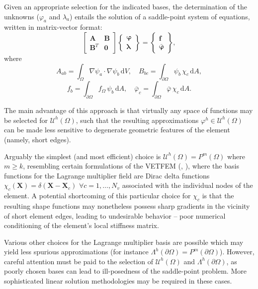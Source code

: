 Given an appropriate selection for the indicated bases, the determination of the unknowns ($\varphi_a$ and $\lambda_a$) entails the solution of a saddle-point system of equations, written in matrix-vector format:
\begin{equation}
	\left[ \begin{array}{cc} \bm{A} & \bm{B} \\ \bm{B}^T & \bm{0} \end{array} \right] \left\{ \begin{array}{c} \boldsymbol{\varphi} \\ \boldsymbol{\lambda} \end{array} \right\} = \left\{ \begin{array}{c} \bm{f} \\ \bar{\boldsymbol{\varphi}} \end{array} \right\},
\end{equation}
where
\begin{equation}
	A_{ab} = \int_{\Omega} \nabla \psi_a \cdot \nabla \psi_b \, \mathrm dV, \quad B_{bc} = \int_{\partial \Omega} \psi_b \, \chi_c \, \mathrm dA,
\end{equation}
\begin{equation}
	f_{b} = \int_{\partial \Omega} f_\Omega \, \psi_b \, \mathrm dA, \quad \bar{\varphi}_{c} = \int_{\partial \Omega} \bar{\varphi} \, \chi_c \, \mathrm dA.
\end{equation}

	The main advantage of this approach is that virtually any space of functions may be selected for $\mathcal{U}^h (\Omega)$, such that the resulting approximations $\varphi^h \in \mathcal{U}^h (\Omega)$ can be made less sensitive to degenerate geometric features of the element (namely, short edges).
	
	Arguably the simplest (and most efficient) choice is $\mathcal{U}^h (\Omega) = P^{m} (\Omega)$ where $m \geq k$, resembling certain formulations of the VETFEM (\cite{Rashid:00}, \cite{Rashid:06}), where the basis functions for the Lagrange multiplier field are Dirac delta functions $\chi_c (\bm{X}) = \delta (\bm{X} - \bm{X}_c) \, \, \forall c = 1, \ldots, N_v$ associated with the individual nodes of the element. A potential shortcoming of this particular choice for $\chi_c$ is that the resulting shape functions may nonetheless possess sharp gradients in the vicinity of short element edges, leading to undesirable behavior -- poor numerical conditioning of the element's local stiffness matrix.
	
	Various other choices for the Lagrange multiplier basis are possible which may yield less spurious approximations (for instance $\Lambda^h (\partial \Omega) = P^{m} (\partial \Omega)$). However, careful attention must be paid to the selection of $\mathcal{U}^h (\Omega)$ and $\Lambda^h (\partial \Omega)$, as poorly chosen bases can lead to ill-posedness of the saddle-point problem. More sophisticated linear solution methodologies may be required in these cases.

